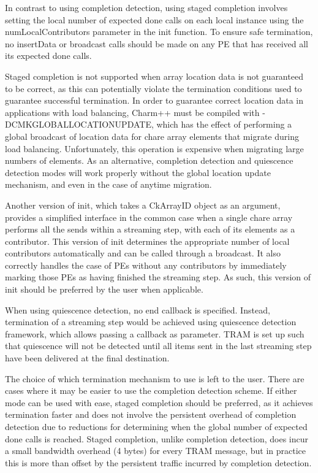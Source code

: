 In contrast to using completion detection, using staged completion
involves setting the local number of expected done calls on each local
instance using the numLocalContributors parameter in the init
function. To ensure safe termination, no insertData or broadcast calls
should be made on any PE that has received all its expected done
calls.

Staged completion is not supported when array location data is not guaranteed to
be correct, as this can potentially violate the termination conditions used to
guarantee successful termination. In order to guarantee correct location data in
applications with load balancing, Charm++ must be compiled with
-DCMK\underline{\hspace{.2cm}}GLOBAL\underline{\hspace{.2cm}}LOCATION\underline{\hspace{.2cm}}UPDATE,
which has the effect of performing a global broadcast of location data for chare
array elements that migrate during load balancing. Unfortunately, this operation
is expensive when migrating large numbers of elements. As an alternative,
completion detection and quiescence detection modes will work properly without
the global location update mechanism, and even in the case of anytime migration.

Another version of init, which takes a CkArrayID object as an
argument, provides a simplified interface in the common case when a
single chare array performs all the sends within a streaming step,
with each of its elements as a contributor. This version of init
determines the appropriate number of local contributors automatically
and can be called through a broadcast. It also correctly handles
the case of PEs without any contributors by immediately marking those
PEs as having finished the streaming step. As such, this version of init
should be preferred by the user when applicable.

When using quiescence detection, no end callback is specified. Instead,
termination of a streaming step would be achieved using quiescence detection
framework, which allows passing a callback as parameter. TRAM is set up such
that quiescence will not be detected until all items sent in the last streaming
step have been delivered at the final destination.

The choice of which termination mechanism to use is left to the
user. There are cases where it may be easier to use the completion
detection scheme. If either mode can be used with ease, staged
completion should be preferred, as it achieves termination faster and
does not involve the persistent overhead of completion detection due
to reductions for determining when the global number of expected done
calls is reached. Staged completion, unlike completion detection, does
incur a small bandwidth overhead (4 bytes) for every TRAM
message, but in practice this is more than offset by the persistent
traffic incurred by completion detection.


